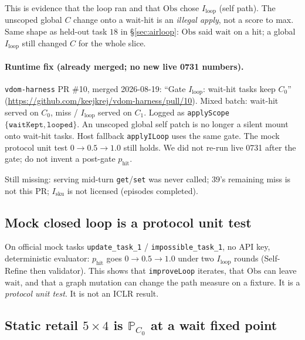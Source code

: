 \documentclass{article}
\begin{document}
This is evidence that the loop ran and that \(\mathrm{Obs}\) chose \(I_{\mathrm{loop}}\) (self path). The unscoped global \(C\) change onto a wait-hit is an \emph{illegal apply}, not a score to max. Same shape as held-out task \(18\) in \S\ref{sec:airloop}: \(\mathrm{Obs}\) said \(\mathrm{wait}\) on a hit; a global \(I_{\mathrm{loop}}\) still changed \(C\) for the whole slice.

\paragraph{Runtime fix (already merged; no new live 0731 numbers).}
\texttt{vdom-harness} PR \#10, merged 2026-08-19: ``Gate \(I_{\mathrm{loop}}\): wait-hit tasks keep \(C_0\)'' (\url{https://github.com/keejkrej/vdom-harness/pull/10}). Mixed batch: wait-hit served on \(C_0\), miss / \(I_{\mathrm{loop}}\) served on \(C_1\). Logged as \texttt{applyScope} \(\{\texttt{waitKept},\texttt{looped}\}\). An unscoped global self patch is no longer a silent mount onto wait-hit tasks. Host fallback \texttt{applyILoop} uses the same gate. The mock protocol unit test \(0\to 0.5\to 1.0\) still holds. We did not re-run live 0731 after the gate; do not invent a post-gate \(p_{\mathrm{hit}}\).

Still missing: serving mid-turn \texttt{get}/\texttt{set} was never called; \(39\)'s remaining miss is not this PR; \(I_{\mathrm{sku}}\) is not licensed (episodes completed).

\subsection{Mock closed loop is a protocol unit test}
\label{sec:mock}

On official mock tasks \texttt{update\_task\_1} / \texttt{impossible\_task\_1}, no API key, deterministic evaluator: \(p_{\mathrm{hit}}\) goes \(0\to 0.5\to 1.0\) under two \(I_{\mathrm{loop}}\) rounds (Self-Refine then validator). This shows that \texttt{improveLoop} iterates, that \(\mathrm{Obs}\) can leave \(\mathrm{wait}\), and that a graph mutation can change the path measure on a fixture. It is a \emph{protocol unit test}. It is not an ICLR result.

\subsection{Static retail \(5\times 4\) is \(\mathbb{P}_{C_0}\) at a wait fixed point}
\label{sec:static}
\end{document}
